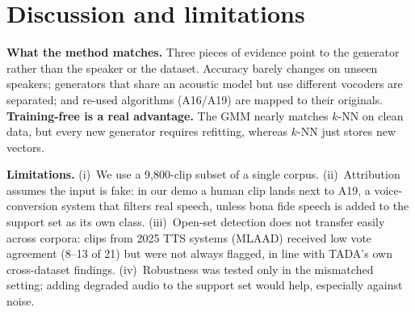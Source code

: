 \documentclass[11pt,a4paper]{article}
\begin{document}
\section{Discussion and limitations}
\textbf{What the method matches.} Three pieces of evidence point to the generator rather than
the speaker or the dataset. Accuracy barely changes on unseen speakers; generators that share
an acoustic model but use different vocoders are separated; and re-used algorithms (A16/A19)
are mapped to their originals. \textbf{Training-free is a real advantage.} The GMM nearly
matches $k$-NN on clean data, but every new generator requires refitting, whereas $k$-NN
just stores new vectors.

\textbf{Limitations.} (i)~We use a 9{,}800-clip subset of a single corpus. (ii)~Attribution
assumes the input is fake: in our demo a human clip lands next to A19, a voice-conversion
system that filters real speech, unless bona fide speech is added to the support set as its
own class. (iii)~Open-set detection does not transfer easily across corpora: clips from 2025
TTS systems (MLAAD) received low vote agreement (8--13 of 21) but were not always flagged,
in line with TADA's own cross-dataset findings. (iv)~Robustness was tested only in the
mismatched setting; adding degraded audio to the support set would help, especially against
noise.

\end{document}
